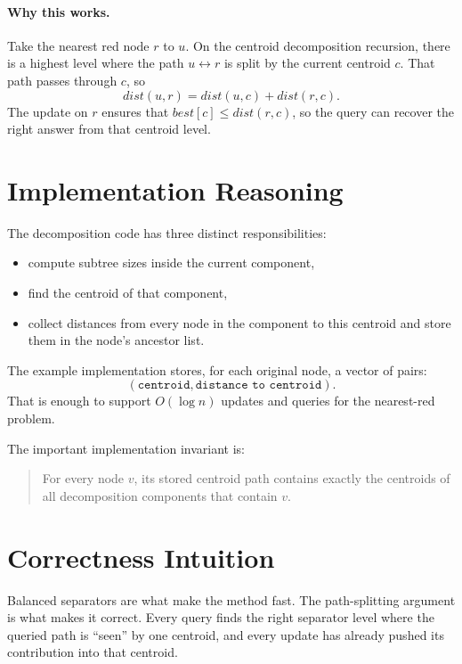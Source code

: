 \paragraph{Why this works.}
Take the nearest red node \(r\) to \(u\). On the centroid decomposition recursion, there is a highest level where the
path \(u \leftrightarrow r\) is split by the current centroid \(c\). That path passes through \(c\), so
\[
dist(u,r) = dist(u,c) + dist(r,c).
\]
The update on \(r\) ensures that \(best[c] \le dist(r,c)\), so the query can recover the right answer from that
centroid level.

\section*{Implementation Reasoning}

The decomposition code has three distinct responsibilities:

\begin{itemize}
  \item compute subtree sizes inside the current component,
  \item find the centroid of that component,
  \item collect distances from every node in the component to this centroid and store them in the node's ancestor list.
\end{itemize}

The example implementation stores, for each original node, a vector of pairs:
\[
(\texttt{centroid}, \texttt{distance to centroid}).
\]
That is enough to support \(O(\log n)\) updates and queries for the nearest-red problem.

The important implementation invariant is:

\begin{quote}
For every node \(v\), its stored centroid path contains exactly the centroids of all decomposition components that
contain \(v\).
\end{quote}

\section*{Correctness Intuition}

Balanced separators are what make the method fast. The path-splitting argument is what makes it correct. Every query
finds the right separator level where the queried path is ``seen'' by one centroid, and every update has already pushed
its contribution into that centroid.

